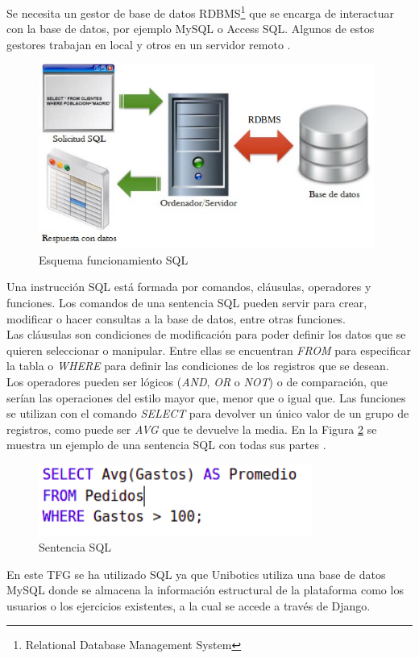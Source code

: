 Se necesita un gestor de base de datos RDBMS\footnote{Relational Database Management System}  que se encarga de interactuar con la base de datos, por ejemplo MySQL o  Access SQL. Algunos de estos gestores trabajan en local y otros en un servidor remoto \cite{rdbms}.\\

\begin{figure}[H]
    \centering
    \includegraphics[width=11cm, keepaspectratio]{img/sql.png}
    \caption{Esquema funcionamiento SQL}
    \label{fig:sql}
\end{figure}
\newpage
Una instrucción SQL está formada por comandos, cláusulas, operadores y funciones. Los comandos de una sentencia SQL pueden servir para crear, modificar o hacer consultas a la base de datos, entre otras funciones.\\

Las cláusulas son condiciones de modificación para poder definir los datos que se quieren seleccionar o manipular. Entre ellas se encuentran \textit{FROM} para especificar la tabla o \textit{WHERE} para definir las condiciones de los registros que se desean.\\

Los operadores pueden ser lógicos (\textit{AND}, \textit{OR} o \textit{NOT}) o de comparación, que serían las operaciones del estilo mayor que, menor que o igual que. Las funciones se utilizan con el comando \textit{SELECT} para devolver un único valor de un grupo de registros, como puede ser\textit{ AVG }que te devuelve la media. En la Figura \ref{fig:ejsql} se muestra un ejemplo de una sentencia SQL con todas sus partes \cite{sql}.\\

\begin{figure}[H]
    \centering
    \includegraphics[width=9cm, keepaspectratio]{img/ejsql.png}
    \caption{Sentencia SQL}
    \label{fig:ejsql}
\end{figure}
En este TFG se ha utilizado SQL ya que Unibotics utiliza una base de datos MySQL donde se almacena la información estructural de la plataforma como los usuarios o los ejercicios existentes, a la cual se accede a través de Django.
\newpage
